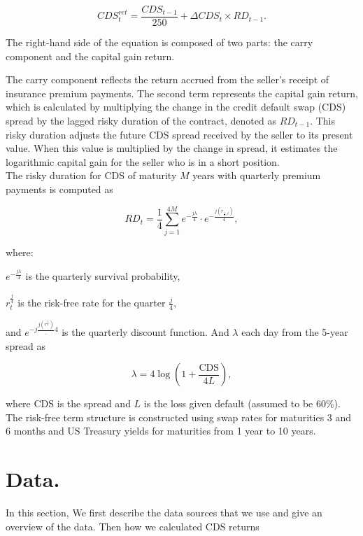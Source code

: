 \documentclass{article}
\begin{document}
\begin{Data science tools for finance final project}
\begin{equation}
    CDS_{t}^{ret} = \frac{CDS_{t-1}}{250} + \Delta CDS_{t} \times RD_{t-1}.

\end{equation}

The right-hand side of the equation is composed of two parts: the carry component and the capital gain return. \

The carry component reflects the return accrued from the seller’s receipt of insurance premium payments. The second term represents the capital gain return, which is calculated by multiplying the change in the credit default swap (CDS) spread by the lagged risky duration of the contract, denoted as \( RD_{t-1} \). This risky duration adjusts the future CDS spread received by the seller to its present value. When this value is multiplied by the change in spread, it estimates the logarithmic capital gain for the seller who is in a short position.\\

The risky duration for CDS of maturity $M$ years with quarterly premium payments is computed as


\begin{equation}
RD_t = \frac{1}{4} \sum_{j=1}^{4M} e^{-\frac{j\lambda}{4}} \cdot e^{-\frac{j(r_{\frac{j}{4}, t})}{4}},
\end{equation}




where:\


$e^{-\frac{j\lambda}{4}}$ is the quarterly survival probability, \ 

$r^{\frac{j}{4}}_t$ is the risk-free rate for the quarter $\frac{j}{4}$,\

and $e^{-j\frac{j(r^{\frac{j}{4}})}_{4}}$ is the quarterly discount function. And  $\lambda$ each day from the 5-year spread as

\[
\lambda = 4 \log \left(1 + \frac{\text{CDS}}{4L}\right),
\]

where $\text{CDS}$ is the spread and $L$ is the loss given default (assumed to be 60\%). The risk-free term structure is constructed using swap rates for maturities 3 and 6 months and US Treasury yields for maturities from 1 year to 10 years.


\section{Data.}
In this section, We first describe the data sources that we use and give an overview of the data. Then how we calculated CDS returns



\end{Data science tools for finance final project}
\end{document}
